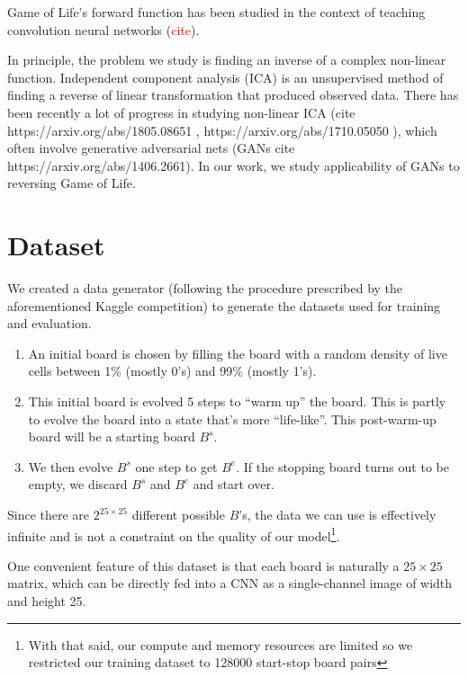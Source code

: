 \documentclass[conference]{IEEEtran}
\newcommand\todo[1]{\textcolor{red}{#1}}
\begin{document}
Game of Life's forward function has been studied in the context of teaching convolution neural networks (\todo{cite}).

In principle, the problem we study is finding an inverse of a complex non-linear function.  Independent component analysis (ICA)  is an unsupervised method of finding a reverse of linear transformation that produced observed data. There has been recently a lot of progress in studying non-linear ICA (cite https://arxiv.org/abs/1805.08651 , https://arxiv.org/abs/1710.05050 ), which often involve generative adversarial nets (GANs cite https://arxiv.org/abs/1406.2661). In our work, we study applicability of GANs to reversing Game of Life.

\section{Dataset}

We created a data generator (following the procedure prescribed by the aforementioned Kaggle competition) to generate the datasets used for training and evaluation.

\begin{enumerate}
\item An initial board is chosen by filling the board with a random density of live cells between 1\% (mostly 0's) and 99\% (mostly 1's).
\item This initial board is evolved 5 steps to ``warm up'' the board. This is partly to evolve the board into a state that's more ``life-like''. This post-warm-up board will be a starting board $B^{s}$.
\item We then evolve $B^{s}$ one step to get $B^e$. If the stopping board turns out to be empty, we discard $B^s$ and $B^e$ and start over.
\end{enumerate}

Since there are $2^{25 \times 25}$ different possible $B$'s, the data we can use is effectively infinite and is not a constraint on the quality of our model\footnote{With that said, our compute and memory resources are limited so we restricted our training dataset to 128000 start-stop board pairs}. 

One convenient feature of this dataset is that each board is naturally a $25 \times 25$ matrix, which can be directly fed into a CNN as a single-channel image of width and height 25.
\end{document}
